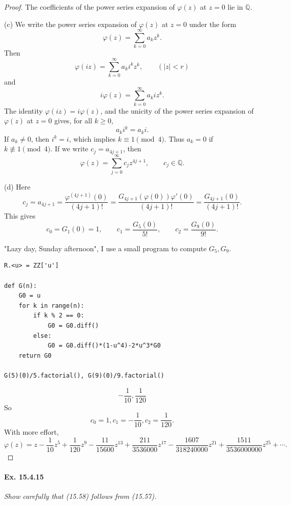 \documentclass[11pt,a4paper]{article}
\newcommand{\Q}{\mathbb{Q}}
\begin{document}
\begin{proof}
The coefficients of the power series expansion of $\varphi(z)$ at $z=0$ lie in $\Q$.
\item[(c)]We write the power series expansion of $\varphi(z)$  at $z = 0$ under the form $$\varphi(z) = \sum_{k=0}^\infty a_k z^k.$$
Then 
$$\varphi(iz) = \sum_{k=0}^\infty a_k i^k z^k,\qquad (|z|<r)$$
and 
$$i \varphi(z) = \sum_{k=0}^\infty a_k i z^k.$$
The identity $\varphi(iz) = i\varphi(z)$, and the unicity of the power series expansion of $\varphi(z)$ at $z=0$ gives, for all $k\geq 0$,
$$a_k i^k = a_k i.$$
If $a_k \ne 0$, then $i^k = i$, which implies $k \equiv 1 \pmod 4$. Thus $a_k = 0$ if $k \not \equiv 1 \pmod 4$. If we write $c_j = a_{4j+1}$, then 
$$\varphi(z) = \sum_{j=0}^\infty c_j z^{4j+1},\qquad c_j \in \Q.$$
\item[(d)] Here
$$c_j = a_{4j+1} = \frac{\varphi^{(4j+1)}(0)}{(4j+1)!} = \frac{G_{4j+1}(\varphi(0)) \varphi'(0)}{(4j+1)!} = \frac{G_{4j+1}(0)}{(4j+1)!}.$$
This gives
$$c_0 = G_1(0) = 1,\qquad c_1 = \frac{G_5(0)}{5!}, \qquad c_2 = \frac{G_9(0)}{9!}.$$

"Lazy day, Sunday afternoon", I use a small program to compute $G_5,G_9$.
\begin{verbatim}
R.<u> = ZZ['u'] 

def G(n):
    G0 = u
    for k in range(n):
        if k % 2 == 0:
            G0 = G0.diff()
        else:
            G0 = G0.diff()*(1-u^4)-2*u^3*G0
    return G0
    
G(5)(0)/5.factorial(), G(9)(0)/9.factorial()
\end{verbatim}
$$
-\frac{1}{10}, \frac{1}{120}
$$
So
$$c_0 = 1, c_1 = -\frac{1}{10}, c_2 =  \frac{1}{120}.$$
With more effort,
$$\varphi(z) = z -\frac{1}{10} z^5 + \frac{1}{120} z^9 -\frac{11}{15600}z^{13} +
\frac{211}{3536000} z^{17} -\frac{1607}{318240000} z^{21}
+ \frac{1511}{3536000000}z^{25} + \cdots.
$$
\end{proof}

\paragraph{Ex. 15.4.15}{\it  Show carefully that (15.58) follows from (15.57).
}
\end{document}
